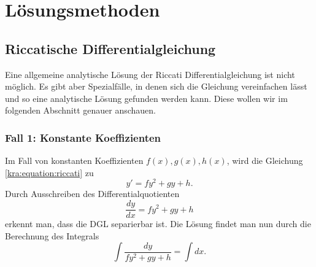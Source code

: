 \section{Lösungsmethoden} \label{kra:section:loesung}

\subsection{Riccatische Differentialgleichung} \label{kra:loesung:riccati}
Eine allgemeine analytische Lösung der Riccati Differentialgleichung ist nicht möglich.
Es gibt aber Spezialfälle, in denen sich die Gleichung vereinfachen lässt und so eine analytische Lösung gefunden werden kann.
Diese wollen wir im folgenden Abschnitt genauer anschauen.

\subsubsection{Fall 1: Konstante Koeffizienten}
Im Fall von konstanten Koeffizienten $f(x), g(x), h(x)$, wird die Gleichung \eqref{kra:equation:riccati} zu
\begin{equation}
    y' = fy^2 + gy + h.
\end{equation}
Durch Ausschreiben des Differentialquotienten
\begin{equation}
    \frac{dy}{dx} = fy^2 + gy + h
\end{equation}
erkennt man, dass die DGL separierbar ist. Die Lösung findet man nun durch die Berechnung des Integrals
\begin{equation} \label{kra:equation:case1_int}
    \int \frac{dy}{fy^2 + gy + h} = \int dx.
\end{equation}


